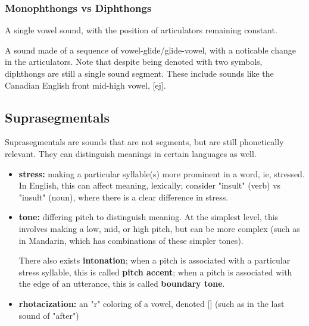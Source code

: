 \documentclass[12pt]{article}
\begin{document}
\subsubsection{Monophthongs vs Diphthongs}

\begin{definitionEnd}[Monophthong]
  A single vowel sound, with the position of articulators remaining constant.
\end{definitionEnd}

\begin{definitionEnd}[Diphthong]
  A sound made of a sequence of vowel-glide/glide-vowel, with a noticable change in the articulators. Note that despite being denoted with two symbols, diphthongs are still a single sound segment. These include sounds like the Canadian English front mid-high vowel, [ej].
\end{definitionEnd}

\subsection{Suprasegmentals}
\begin{definitionEnd}[Suprasegmental]
  Suprasegmentals are sounds that are not segments, but are still phonetically relevant. They can distinguish meanings in certain languages as well.
\end{definitionEnd}

\begin{itemize}
  \item \textbf{stress:} making a particular syllable(s) more prominent in a word, ie, stressed. In English, this can affect meaning, lexically; consider "insult" (verb) vs "insult" (noun), where there is a clear difference in stress.
  

  \item \textbf{tone:} differing pitch to distinguish meaning. At the simplest level, this involves making a low, mid, or high pitch, but can be more complex (such as in Mandarin, which has combinations of these simpler tones).
  
  There also exists \textbf{intonation}; when a pitch is associated with a particular stress syllable, this is called \textbf{pitch accent}; when a pitch is associated with the edge of an utterance, this is called \textbf{boundary tone}.

  \item \textbf{rhotacization:} an "r" coloring of a vowel, denoted  [] (such as in the last sound of "after")
\end{itemize}
\end{document}
